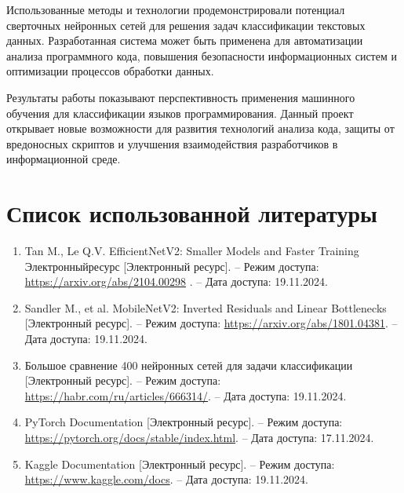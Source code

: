 {Использованные методы и технологии продемонстрировали потенциал сверточных нейронных сетей для решения задач классификации текстовых данных. Разработанная система может быть применена для автоматизации анализа программного кода, повышения безопасности информационных систем и оптимизации процессов обработки данных. 

Результаты работы показывают перспективность применения машинного обучения для классификации языков программирования. Данный проект открывает новые возможности для развития технологий анализа кода, защиты от вредоносных скриптов и улучшения взаимодействия разработчиков в информационной среде. 
\newpage
\section{Список использованной литературы}
\sloppy
{
    \begin{enumerate}
        \item Tan M., Le Q.V. EfficientNetV2: Smaller Models and Faster Training Электронныйресурс  [Электронный ресурс]. – Режим доступа: \url{https://arxiv.org/abs/2104.00298} . – Дата доступа: 19.11.2024. 
        \item Sandler M., et al. MobileNetV2: Inverted Residuals and Linear Bottlenecks [Электронный ресурс]. – Режим доступа: \url{https://arxiv.org/abs/1801.04381}. – Дата доступа: 19.11.2024.
        \item Большое сравнение 400 нейронных сетей для задачи классификации [Электронный ресурс]. – Режим доступа: \url{https://habr.com/ru/articles/666314/}. – Дата доступа: 19.11.2024.
        \item PyTorch Documentation [Электронный ресурс]. – Режим доступа: \url{https://pytorch.org/docs/stable/index.html}. – Дата доступа: 17.11.2024.
        \item Kaggle Documentation [Электронный ресурс]. – Режим доступа: \url{https://www.kaggle.com/docs}. – Дата доступа: 19.11.2024.
    \end{enumerate}
}
}